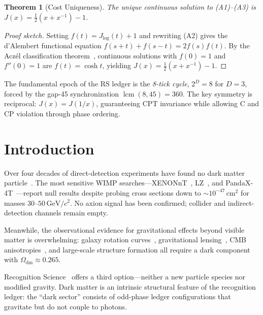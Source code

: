 \documentclass[12pt,a4paper]{article}
\newtheorem{theorem}{Theorem}[section]
\theoremstyle{definition}
\theoremstyle{remark}
\begin{document}
\begin{theorem}[Cost Uniqueness]
\label{thm:unique}
The unique continuous solution to \textup{(A1)--(A3)} is
$J(x) = \tfrac{1}{2}(x + x^{-1}) - 1$.
\end{theorem}

\begin{proof}[Proof sketch]
Setting $f(t) = J_{\log}(t) + 1$ and rewriting \textup{(A2)} gives
the d'Alembert functional equation $f(s+t) + f(s-t) = 2f(s)f(t)$.
By the Acz\'el classification theorem~\cite{Aczel1966}, continuous
solutions with $f(0) = 1$ and $f''(0) = 1$ are $f(t) = \cosh t$,
yielding $J(x) = \tfrac{1}{2}(x + x^{-1}) - 1$.
\end{proof}

\noindent The fundamental epoch of the RS ledger is the \emph{8-tick
cycle}, $2^D = 8$ for $D = 3$, forced by the gap-45 synchronization
$\operatorname{lcm}(8, 45) = 360$.  The key symmetry is reciprocal:
$J(x) = J(1/x)$, guaranteeing CPT invariance while allowing C and CP
violation through phase ordering.

\section{Introduction}
\label{sec:intro}

Over four decades of direct-detection experiments have found
no dark matter particle~\cite{Schumann2019}.  The most
sensitive WIMP searches---XENONnT~\cite{XENONnT2023},
LZ~\cite{LZ2022}, and PandaX-4T~\cite{PandaX2022}---report
null results despite probing cross sections down to
$\sim 10^{-47}\,\mathrm{cm}^2$ for masses
$30$--$50\,\mathrm{GeV}/c^2$.  No axion signal has been
confirmed; collider and indirect-detection channels remain
empty.

Meanwhile, the observational evidence for gravitational
effects beyond visible matter is overwhelming: galaxy
rotation curves~\cite{Rubin1980}, gravitational
lensing~\cite{Clowe2006}, CMB anisotropies~\cite{Planck2020},
and large-scale structure formation all require a dark
component with $\Omega_{\mathrm{dm}} \approx 0.265$.

Recognition Science~\cite{RS_Axioms} offers a third
option---neither a new particle species nor modified gravity.
Dark matter is an intrinsic structural feature of the
recognition ledger: the ``dark sector'' consists of odd-phase
ledger configurations that gravitate but do not couple to photons.
\end{document}
